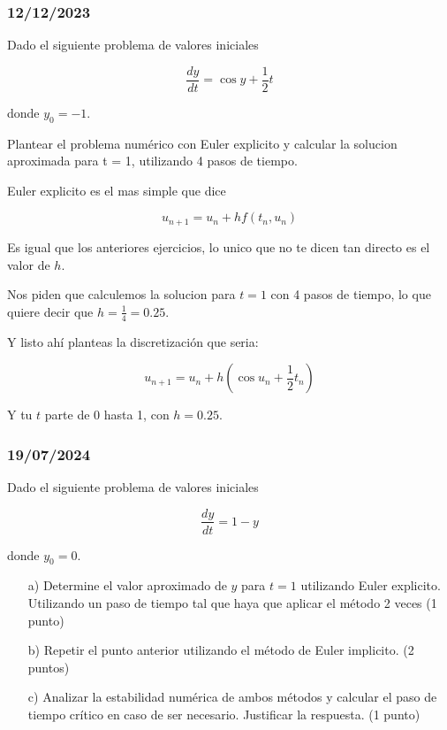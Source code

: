 \subsubsection{12/12/2023}

Dado el siguiente problema de valores iniciales

\[
 \frac{dy}{dt} = \cos{y} + \frac{1}{2}t
\]


donde $y_0 = -1$.

Plantear el problema numérico con Euler explicito y calcular la solucion aproximada para t = 1, utilizando 4 pasos de tiempo. 


Euler explicito es el mas simple que dice 

$$u_{n+1} = u_n + hf(t_n,u_n)$$

Es igual que los anteriores ejercicios, lo unico que no te dicen tan directo es el valor de $h$. 

Nos piden que calculemos la solucion para $t=1$ con 4 pasos de tiempo, lo que quiere decir que $h = \frac{1}{4} = 0.25$.

Y listo ahí planteas la discretización que seria: 

$$u_{n+1} = u_n + h(\cos{u_n} + \frac{1}{2} t_n)$$

Y tu $t$ parte de 0 hasta 1, con $h =0.25$.  



\subsubsection{19/07/2024}

Dado el siguiente problema de valores iniciales

\[
 \frac{dy}{dt} = 1 - y
\]


donde $y_0 = 0$.

\begin{enumerate}
    \item[a)] Determine el valor aproximado de $y$ para $t=1$ utilizando Euler explicito. Utilizando un paso de tiempo tal que haya que aplicar el método 2 veces (1 punto)
    \item[b)] Repetir el punto anterior utilizando el método de Euler implicito. (2 puntos)
    \item[c)] Analizar la estabilidad numérica de ambos métodos y calcular el paso de tiempo crítico en caso de ser necesario. Justificar la respuesta. (1 punto)
\end{enumerate}



